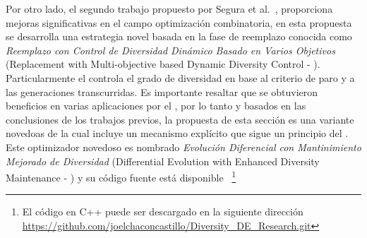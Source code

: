 %
Por otro lado, el segundo trabajo propuesto por Segura et al.~\cite{segura2016novel}, proporciona mejoras significativas en el campo optimización combinatoria, en esta propuesta se desarrolla una estrategia novel basada en la fase de reemplazo conocida como \textit{Reemplazo con Control de Diversidad Dinámico Basado en Varios Objetivos} (Replacement with Multi-objective based Dynamic Diversity Control - \RMDDC{}).
%
Particularmente el \RMDDC{} controla el grado de diversidad en base al criterio de paro y a las generaciones transcurridas.
%
Es importante resaltar que se obtuvieron beneficios en varias aplicaciones por el \RMDDC{}, por lo tanto y basados en las conclusiones de los trabajos previos, la propuesta de esta sección es una variante novedoas de \DE{} la cual incluye un mecanismo explícito que sigue un principio del \RMDDC{}.
%
Este optimizador novedoso es nombrado \textit{Evolución Diferencial con Mantinimiento Mejorado de Diversidad} (Differential Evolution with Enhanced Diversity Maintenance - \DEEDM{}) y su código fuente está disponible ~\footnote{El código en C++ puede ser descargado en la siguiente dirección \url{https://github.com/joelchaconcastillo/Diversity\_DE\_Research.git} }


